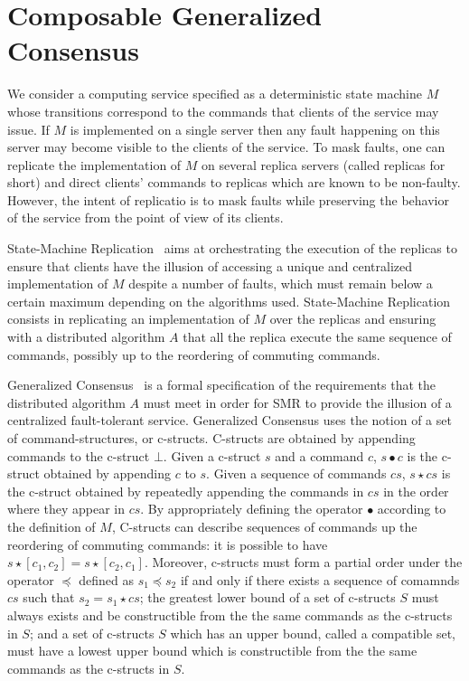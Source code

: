 \section{Composable Generalized Consensus}

We consider a computing service specified as a deterministic state machine $M$ whose transitions correspond to the commands that clients of the service may issue.
If $M$ is implemented on a single server then any fault happening on this server may become visible to the clients of the service.
To mask faults, one can replicate the implementation of $M$ on several replica servers (called replicas for short) and direct clients' commands to replicas which are known to be non-faulty.
However, the intent of replicatio is to mask faults while preserving the behavior of the service from the point of view of its clients.

State-Machine Replication~\cite{Schneider90ImplementingFaulttolerantServicesUsingStateMachine} aims at orchestrating the execution of the replicas to ensure that clients have the illusion of accessing a unique and centralized implementation of $M$ despite a number of faults, which must remain below a certain maximum depending on the algorithms used.
State-Machine Replication consists in replicating an implementation of $M$ over the replicas and ensuring with a distributed algorithm $A$ that all the replica execute the same sequence of commands, possibly up to the reordering of commuting commands.

Generalized Consensus~\cite{Lamport05GeneralizeConsensus} is a formal specification of the requirements that the distributed algorithm $A$ must meet in order for SMR to provide the illusion of a centralized fault-tolerant service.
Generalized Consensus uses the notion of a set of command-structures, or c-structs. C-structs are obtained by appending commands to the c-struct $\bot$. Given a c-struct $s$ and a command $c$, $s \bullet c$ is the c-struct obtained by appending $c$ to $s$. Given a sequence of commands $cs$, $s\star cs$ is the c-struct obtained by repeatedly appending the commands in $cs$ in the order where they appear in $cs$. By appropriately defining the operator $\bullet$ according to the
definition of $M$, C-structs can describe sequences of commands up the reordering of commuting
commands: it is possible to have $s \star \left[c_1,c_2\right] = s \star \left[c_2,c_1\right]$.
Moreover, c-structs must form a partial order under the operator $\preceq$ defined as $s_1 \preceq s_2$ if and only if there exists a sequence of comamnds $cs$ such that $s_2 = s_1 \star cs$; the greatest lower bound of a set of c-structs $S$ must always exists and be constructible from the the same commands as the c-structs in $S$; and a set of c-structs $S$ which has an upper bound, called a compatible set, must have a lowest upper bound which is constructible from the the same commands as the c-structs in $S$. 


